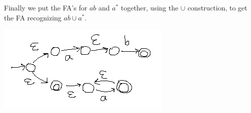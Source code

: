 Finally we put the FA's for $ab$ and $a^*$ together, using the $\cup$ construction, to get the FA recognizing $ab\cup a^*$.

\begin{center}
\includegraphics[scale=0.75]{2-10c}
\end{center} 


